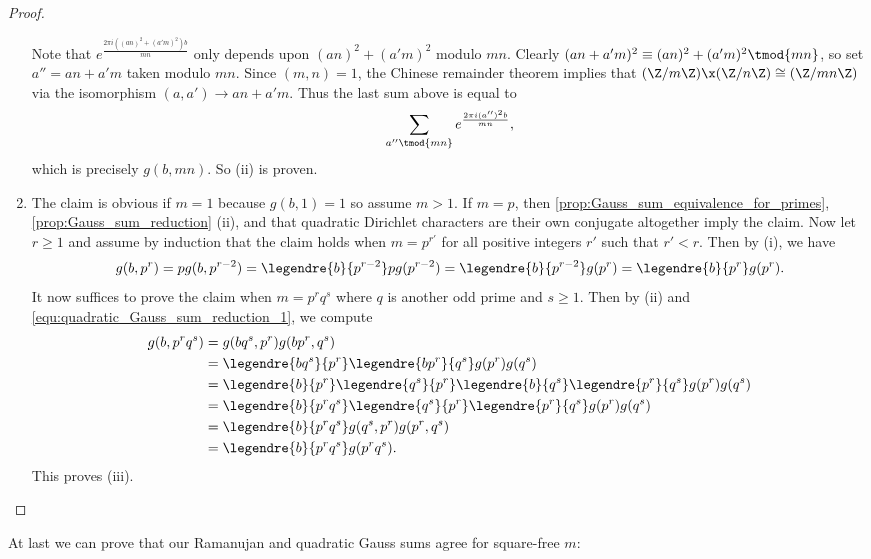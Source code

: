 \begin{proof}
\begin{enumerate}[label=(\roman*)]
\[            \]
            Note that $e^{\frac{2\pi i\left((an)^{2}+(a'm)^{2}\right)b}{mn}}$ only depends upon $(an)^{2}+(a'm)^{2}$ modulo $mn$. Clearly $(an+a'm)^{2} \equiv (an)^{2}+(a'm)^{2} \tmod{mn}$, so set $a'' = an+a'm$ taken modulo $mn$. Since $(m,n) = 1$, the Chinese remainder theorem implies that $(\Z/m\Z) \x (\Z/n\Z) \cong (\Z/mn\Z)$ via the isomorphism $(a,a') \to an+a'm$. Thus the last sum above is equal to
            \[
              \sum_{a'' \tmod{mn}}e^{\frac{2\pi i(a'')^{2}b}{mn}},
            \]
            which is precisely $g(b,mn)$. So (ii) is proven.
          \item The claim is obvious if $m = 1$ because $g(b,1) = 1$ so assume $m > 1$. If $m = p$, then \cref{prop:Gauss_sum_equivalence_for_primes}, \cref{prop:Gauss_sum_reduction} (ii), and that quadratic Dirichlet characters are their own conjugate altogether imply the claim. Now let $r \ge 1$ and assume by induction that the claim holds when $m = p^{r'}$ for all positive integers $r'$ such that $r' < r$. Then by (i), we have
          \begin{equation}\label{equ:quadratic_Gauss_sum_reduction_1}
            g(b,p^{r}) = pg(b,p^{r-2}) = \legendre{b}{p^{r-2}}pg(p^{r-2}) = \legendre{b}{p^{r-2}}g(p^{r}) = \legendre{b}{p^{r}}g(p^{r}).
          \end{equation}
          It now suffices to prove the claim when $m = p^{r}q^{s}$ where $q$ is another odd prime and $s \ge 1$. Then by (ii) and \cref{equ:quadratic_Gauss_sum_reduction_1}, we compute
          \begin{align*}
            g(b,p^{r}q^{s}) &= g(bq^{s},p^{r})g(bp^{r},q^{s}) \\
            &= \legendre{bq^{s}}{p^{r}}\legendre{bp^{r}}{q^{s}}g(p^{r})g(q^{s}) \\
            &= \legendre{b}{p^{r}}\legendre{q^{s}}{p^{r}}\legendre{b}{q^{s}}\legendre{p^{r}}{q^{s}}g(p^{r})g(q^{s}) \\
            &= \legendre{b}{p^{r}q^{s}}\legendre{q^{s}}{p^{r}}\legendre{p^{r}}{q^{s}}g(p^{r})g(q^{s}) \\
            &= \legendre{b}{p^{r}q^{s}}g(q^{s},p^{r})g(p^{r},q^{s}) \\
            &= \legendre{b}{p^{r}q^{s}}g(p^{r}q^{s}).
          \end{align*}
          This proves (iii).
        \end{enumerate}
      \end{proof}

      At last we can prove that our Ramanujan and quadratic Gauss sums agree for square-free $m$:

